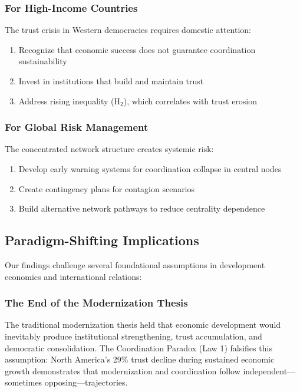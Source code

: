 \documentclass[12pt,a4paper]{article}
\begin{document}
\subsubsection{For High-Income Countries}

The trust crisis in Western democracies requires domestic attention:

\begin{enumerate}
    \item Recognize that economic success does not guarantee coordination sustainability
    \item Invest in institutions that build and maintain trust
    \item Address rising inequality (H$_2$), which correlates with trust erosion
\end{enumerate}

\subsubsection{For Global Risk Management}

The concentrated network structure creates systemic risk:

\begin{enumerate}
    \item Develop early warning systems for coordination collapse in central nodes
    \item Create contingency plans for contagion scenarios
    \item Build alternative network pathways to reduce centrality dependence
\end{enumerate}

\subsection{Paradigm-Shifting Implications}

Our findings challenge several foundational assumptions in development economics and international relations:

\subsubsection{The End of the Modernization Thesis}

The traditional modernization thesis held that economic development would inevitably produce institutional strengthening, trust accumulation, and democratic consolidation. The Coordination Paradox (Law 1) falsifies this assumption: North America's 29\% trust decline during sustained economic growth demonstrates that modernization and coordination follow independent---sometimes opposing---trajectories.
\end{document}
